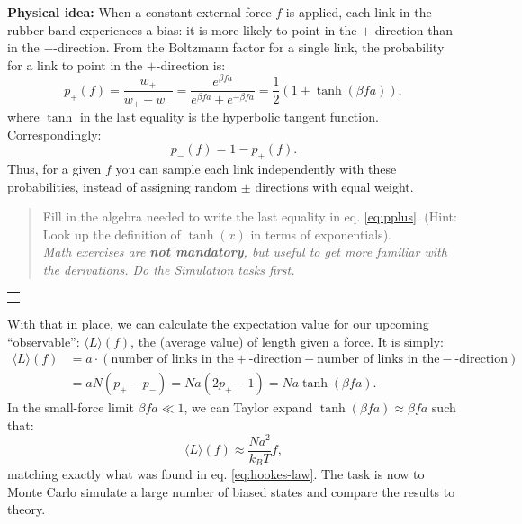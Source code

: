 \documentclass[11pt]{article}
\newcommand{\exercise}[1]{\par \vspace{0.5cm} \noindent  {\large \colorbox{mygrey}{\begin{minipage}{\textwidth}{\textbf{Math exercise}}\end{minipage}}} \par \noindent \begin{quote} 
\small{#1} \\
\footnotesize{\textit{Math exercises are \textbf{not mandatory}, but useful to get more familiar with the derivations. Do the Simulation tasks first.}}
\end{quote} 
\begin{tabular}{c} \\ \toprule \\ \hspace{15cm} \\ \end{tabular}}
\begin{document}
\noindent \textbf{Physical idea:} When a constant external force $f$ is applied, each link in the rubber band experiences a bias: it is more likely to point in the $+$-direction than in the $-$-direction.
From the Boltzmann factor for a single link, the probability for a link to point in the $+$-direction is:
\begin{equation}
\label{eq:pplus}
p_+(f) = \frac{w_+}{w_+ + w_-} = \frac{e^{\beta f a}}{e^{\beta f a} + e^{-\beta f a}} = \frac{1}{2}(1 + \tanh(\beta f a)), 
\end{equation}
where $\tanh$ in the last equality is the hyperbolic tangent function. Correspondingly:
\begin{equation}
  p_-(f) = 1 - p_+(f).
\end{equation}
Thus, for a given $f$ you can sample each link independently with these probabilities, instead of assigning random $\pm$ directions with equal weight.

\exercise{
Fill in the algebra needed to write the last equality in eq. \eqref{eq:pplus}. (Hint: Look up the definition of $\tanh(x)$ in terms of exponentials).
}

With that in place, we can calculate the expectation value for our upcoming ``observable'': $\langle L \rangle(f)$, the (average value) of length given a force. It is simply:
\begin{eqnarray}
\label{eq:full-analytic}
  \langle L \rangle(f) & = a \cdot (\text{number of links in the}+\text{-direction}-\text{number of links in the}-\text{-direction}) \\ 
  & = aN(p_+ - p_-) = Na (2p_+ - 1) = Na\tanh(\beta f a).
\end{eqnarray}
In the small-force limit $\beta f a \ll 1$, we can Taylor expand $\tanh(\beta f a) \approx \beta f a$ such that:
\begin{equation}
\label{eq:hooke-approximation}
  \langle L \rangle(f) \approx \frac{Na^2}{k_B T}f,
\end{equation}
matching exactly what was found in eq. \eqref{eq:hookes-law}. The task is now to Monte Carlo simulate a large number of biased states and compare the results to theory.
\end{document}

